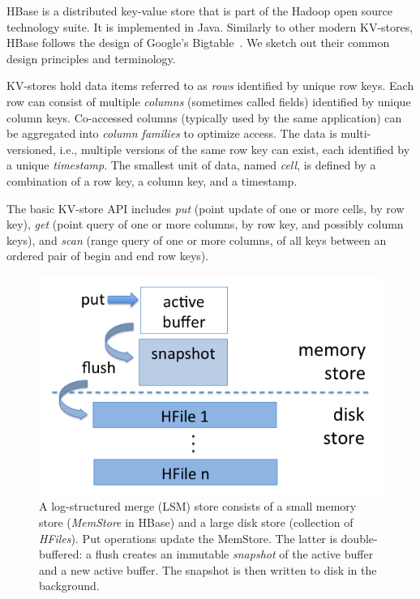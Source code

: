 
HBase is a distributed key-value store that is part of the Hadoop open source  technology suite. 
It is implemented in Java. Similarly to other modern KV-stores, HBase follows the design of 
Google's Bigtable~\cite{Chang2008}. We sketch out their common design principles 
and terminology. 

KV-stores hold data items referred to as \emph{rows} identified by unique 
row keys. Each row can consist of multiple \emph{columns} (sometimes called fields) identified by unique 
column keys. Co-accessed columns (typically used by the same application) can be 
aggregated into  \emph{column families} to optimize access. The data is multi-versioned, 
i.e., multiple versions of the same row key can exist, each identified by a unique {\em timestamp}. 
The smallest unit of data, named {\em cell}, is defined by a combination of a row key, a
column key, and a timestamp.

The basic KV-store API includes \emph{put} (point update of one or more cells, by row key), 
\emph{get} (point query of one or more columns, by row key, and possibly column keys), 
and \emph{scan} (range query of one or more columns, of all keys between 
an ordered pair of begin and end row keys). 

\begin{figure}[tb]
\center
\includegraphics[width=0.9\columnwidth]{LSM} 
\caption{A log-structured merge (LSM) store consists of a small memory store ({\em MemStore} in HBase) 
and a large disk store (collection of {\em HFiles}). Put operations update the MemStore. The latter is 
double-buffered: a flush creates an immutable \emph{snapshot} of the active buffer and  a new active 
buffer. The snapshot is then written to disk in the background.}
\label{fig:LSM}
\end{figure}

